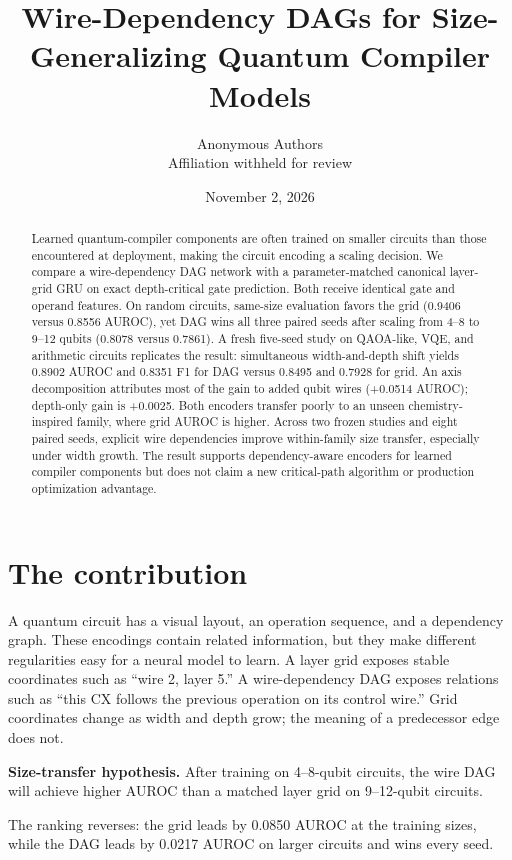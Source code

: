 \documentclass[10pt,twocolumn]{article}
\title{Wire-Dependency DAGs for Size-Generalizing Quantum Compiler Models}
\author{Anonymous Authors \\ Affiliation withheld for review}
\date{November 2, 2026}
\begin{document}
\maketitle

\begin{abstract}
Learned quantum-compiler components are often trained on smaller circuits than those encountered at deployment, making the circuit encoding a scaling decision. We compare a wire-dependency DAG network with a parameter-matched canonical layer-grid GRU on exact depth-critical gate prediction. Both receive identical gate and operand features. On random circuits, same-size evaluation favors the grid (0.9406 versus 0.8556 AUROC), yet DAG wins all three paired seeds after scaling from 4--8 to 9--12 qubits (0.8078 versus 0.7861). A fresh five-seed study on QAOA-like, VQE, and arithmetic circuits replicates the result: simultaneous width-and-depth shift yields 0.8902 AUROC and 0.8351 F1 for DAG versus 0.8495 and 0.7928 for grid. An axis decomposition attributes most of the gain to added qubit wires (+0.0514 AUROC); depth-only gain is +0.0025. Both encoders transfer poorly to an unseen chemistry-inspired family, where grid AUROC is higher. Across two frozen studies and eight paired seeds, explicit wire dependencies improve within-family size transfer, especially under width growth. The result supports dependency-aware encoders for learned compiler components but does not claim a new critical-path algorithm or production optimization advantage.
\end{abstract}

\section{The contribution}

A quantum circuit has a visual layout, an operation sequence, and a dependency graph. These encodings contain related information, but they make different regularities easy for a neural model to learn. A layer grid exposes stable coordinates such as ``wire 2, layer 5.'' A wire-dependency DAG exposes relations such as ``this CX follows the previous operation on its control wire.'' Grid coordinates change as width and depth grow; the meaning of a predecessor edge does not.

\noindent\textbf{Size-transfer hypothesis.} After training on 4--8-qubit circuits, the wire DAG will achieve higher AUROC than a matched layer grid on 9--12-qubit circuits.

The ranking reverses: the grid leads by 0.0850 AUROC at the training sizes, while the DAG leads by 0.0217 AUROC on larger circuits and wins every seed.
\end{document}
